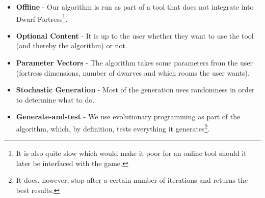 \begin{itemize}

	\item \textbf{Offline} - Our algorithm is run as part of a tool that does not integrate into Dwarf Fortress\footnote{ It is also quite slow which would make it poor for an online tool should it later be interfaced with the game\cite{togelius2011search}.}.

	\item \textbf{Optional Content} - It is up to the user whether they want to use the tool (and thereby the algorithm) or not.

	\item \textbf{Parameter Vectors} - The algorithm takes some parameters from the user (fortress dimensions, number of dwarves and which rooms the user wants).

	\item \textbf{Stochastic Generation} - Most of the generation uses randomness in order to determine what to do.

	\item \textbf{Generate-and-test} - We use evolutionary programming as part of the algorithm, which, by definition, tests everything it generates\footnote{It does, however, stop after a certain number of iterations and returns the best results.}.

\end{itemize}









